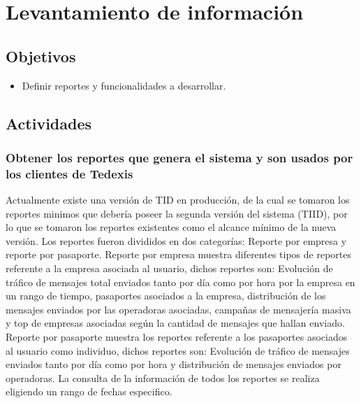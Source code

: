 
\section{Levantamiento de información} \label{sect:Levantamiento de informacion}

\subsection{Objetivos}
\begin{itemize}[noitemsep,nolistsep]
\item Definir reportes y funcionalidades a desarrollar. 
\end{itemize}

\subsection{Actividades}

\subsubsection{Obtener los reportes que genera el sistema y son usados por los clientes de Tedexis}

\indent Actualmente existe una versión de TID en producción, de la cual se tomaron los reportes minimos que debería poseer la segunda versión del sistema (TIID), por lo que se tomaron los reportes existentes como el alcance mínimo de la nueva versión. Los reportes fueron divididos en dos categorías: Reporte por empresa y reporte por pasaporte.
\newline
\newline
\indent Reporte por empresa muestra diferentes tipos de reportes referente a la empresa asociada al usuario, dichos reportes son: Evolución de tráfico de mensajes total enviados tanto por día como por hora por la empresa en un rango de tiempo, pasaportes asociados a la empresa, distribución de los mensajes enviados por las operadoras asociadas, campañas de mensajería masiva y top de empresas asociadas según la cantidad de mensajes que hallan enviado.
\newline
\newline
\indent Reporte por pasaporte muestra los reportes referente a los pasaportes asociados al usuario como individuo, dichos reportes son: Evolución de tráfico de mensajes enviados tanto por día como por hora y distribución de mensajes enviados por operadoras. La consulta de la información de todos los reportes se realiza eligiendo un rango de fechas especifico.

